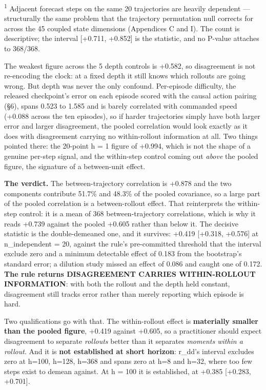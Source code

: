\documentclass[10pt]{article}
\begin{document}
\textsuperscript{1} Adjacent forecast steps on the same 20 trajectories are heavily dependent --- structurally the same problem that the trajectory permutation null corrects for across the 45 coupled state dimensions (Appendices C and I). The count is descriptive; the interval [+0.711, +0.852] is the statistic, and no P-value attaches to 368/368.

The weakest figure across the 5 depth controls is +0.582, so disagreement is not re-encoding the clock: at a fixed depth it still knows which rollouts are going wrong. But depth was never the only confound. Per-episode difficulty, the released checkpoint's error on each episode scored with the causal action pairing (\S{}6), spans 0.523 to 1.585 and is barely correlated with commanded speed (+0.088 across the ten episodes), so if harder trajectories simply have both larger error and larger disagreement, the pooled correlation would look exactly as it does with disagreement carrying no within-rollout information at all. Two things pointed there: the 20-point h = 1 figure of +0.994, which is not the shape of a genuine per-step signal, and the within-step control coming out \emph{above} the pooled figure, the signature of a between-unit effect.

\textbf{The verdict.} The between-trajectory correlation is +0.878 and the two components contribute 51.7\% and 48.3\% of the pooled covariance, so a large part of the pooled correlation is a between-rollout effect. That reinterprets the within-step control: it is a mean of 368 between-trajectory correlations, which is why it reads +0.739 against the pooled +0.605 rather than below it. The decisive statistic is the double-demeaned one, and it survives: +0.419 [+0.318, +0.576] at n\_independent = 20, against the rule's pre-committed threshold that the interval exclude zero and a minimum detectable effect of 0.183 from the bootstrap's standard error; a dilution study missed an effect of 0.086 and caught one of 0.172. \textbf{The rule returns DISAGREEMENT CARRIES WITHIN-ROLLOUT INFORMATION}: with both the rollout and the depth held constant, disagreement still tracks error rather than merely reporting which episode is hard.

Two qualifications go with that. The within-rollout effect is \textbf{materially smaller than the pooled figure}, +0.419 against +0.605, so a practitioner should expect disagreement to separate \emph{rollouts} better than it separates \emph{moments within a rollout}. And it is \textbf{not established at short horizon}: r\_dd's interval excludes zero at h=100, h=128, h=368 and spans zero at h=8 and h=32, where too few steps exist to demean against. At h = 100 it is established, at +0.385 [+0.283, +0.701].
\end{document}
